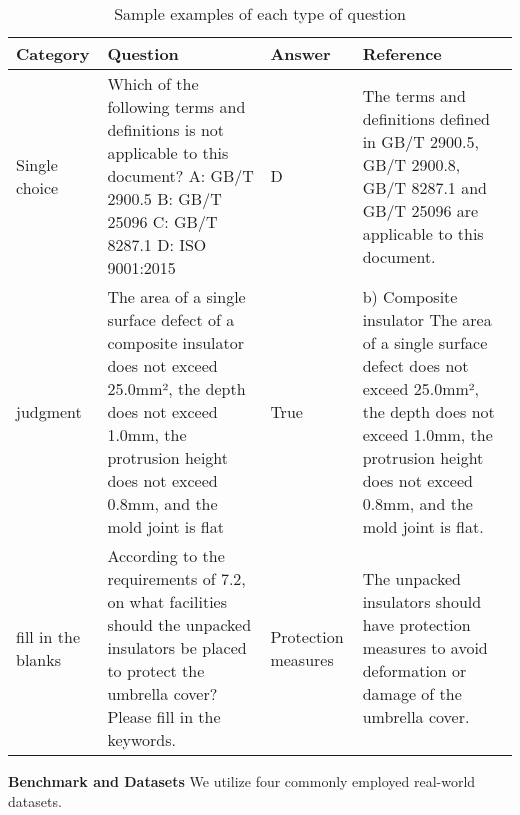 \begin{table}[htbp]
\centering
\caption{Sample examples of each type of question}
\begin{tabular}{p{}p{}p{}p{}}
\toprule
Category& Question & Answer & Reference \\
\midrule
Single choice & Which of the following terms and definitions is not applicable to this document? A: GB/T 2900.5 B: GB/T 25096 C: GB/T 8287.1 D: ISO 9001:2015 & D & The terms and definitions defined in GB/T 2900.5, GB/T 2900.8, GB/T 8287.1 and GB/T 25096 are applicable to this document. \\
 
judgment & The area of a single surface defect of a composite insulator does not exceed 25.0mm², the depth does not exceed 1.0mm, the protrusion height does not exceed 0.8mm, and the mold joint is flat & True & b) Composite insulator The area of a single surface defect does not exceed 25.0mm², the depth does not exceed 1.0mm, the protrusion height does not exceed 0.8mm, and the mold joint is flat. \\
 
fill in the blanks & According to the requirements of 7.2, on what facilities should the unpacked insulators be placed to protect the umbrella cover? Please fill in the keywords. & Protection measures & The unpacked insulators should have protection measures to avoid deformation or damage of the umbrella cover. \\
\bottomrule
\end{tabular}
\label{tab:tab3}
\end{table}



\textbf{Benchmark and Datasets}  
We utilize four commonly employed real-world datasets. 







